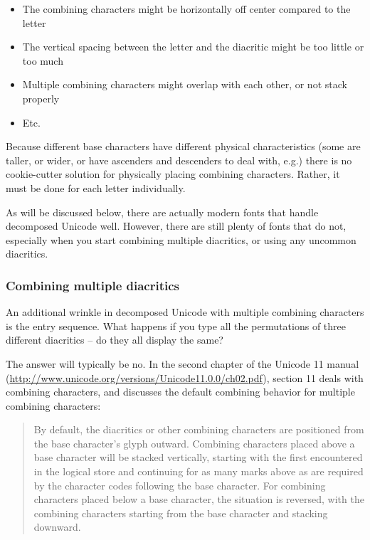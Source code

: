 \documentclass[11pt]{article}
\begin{document}
\begin{itemize}
\item The combining characters might be horizontally off center compared to the letter
\item The vertical spacing between the letter and the diacritic might be too little or too much
\item Multiple combining characters might overlap with each other, or not stack properly
\item Etc.
\end{itemize}

Because different base characters have different physical characteristics (some are taller, or wider, or have ascenders and descenders to deal with, e.g.) there is no cookie-cutter solution for physically placing combining characters. Rather, it must be done for each letter individually.

As will be discussed below, there are actually modern fonts that handle decomposed Unicode well. However, there are still plenty of fonts that do not, especially when you start combining multiple diacritics, or using any uncommon diacritics.

\subsubsection{Combining multiple diacritics}
\label{sec:org8f98ce4}

An additional wrinkle in decomposed Unicode with multiple combining characters is the entry sequence. What happens if you type all the permutations of three different diacritics -- do they all display the same?

The answer will typically be no. In the second chapter of the Unicode 11 manual (\url{http://www.unicode.org/versions/Unicode11.0.0/ch02.pdf}), section 11 deals with combining characters, and discusses the default combining behavior for multiple combining characters:

\begin{quote}
By default, the diacritics or other combining characters are positioned from the base character’s glyph outward. Combining characters placed above a base character will be stacked vertically, starting with the first encountered in the logical store and continuing for as many marks above as are required by the character codes following the base character. For combining characters placed below a base character, the situation is reversed, with the combining characters
starting from the base character and stacking downward.
\end{quote}
\end{document}
